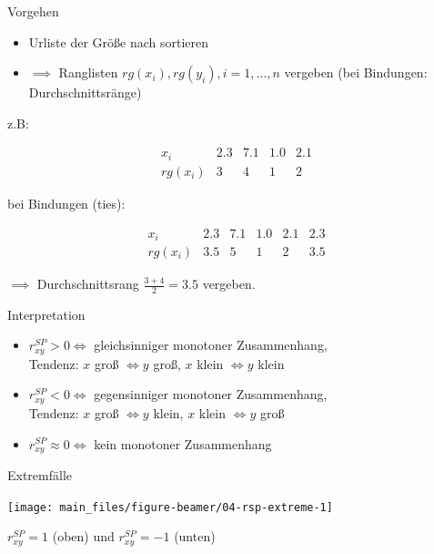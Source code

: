 \documentclass[
  10pt,
  ignorenonframetext,
]{beamer}
\providecommand{\tightlist}{%
  \setlength{\itemsep}{0pt}\setlength{\parskip}{0pt}}
\begin{document}
\begin{frame}{Vorgehen}
\label{vorgehen}
\begin{itemize}
\tightlist
\item
  Urliste der Größe nach sortieren
\item
  \(\implies\) Ranglisten \(rg(x_i), rg(y_i), i = 1,\ldots,n\) vergeben
  (bei Bindungen: Durchschnittsränge)
\end{itemize}

z.B:

\[
\begin{array}{cccccc}
x_i & 2.3 & 7.1 & 1.0 & 2.1\\
rg(x_i) & 3 & 4 & 1 & 2
\end{array}
\]

bei Bindungen (ties):

\[
\begin{array}{cccccc}
x_i & 2.3 & 7.1 & 1.0 & 2.1 & 2.3\\
rg(x_i) & 3.5 & 5 & 1 & 2 & 3.5
\end{array}
\]

\(\implies\) Durchschnittsrang \(\frac{3+4}{2} = 3.5\) vergeben.
\end{frame}

\begin{frame}{Interpretation}
\label{interpretation-2}
\begin{itemize}
\item
  \(r^{SP}_{xy} > 0 \iff\) gleichsinniger monotoner Zusammenhang,\\
  Tendenz: \(x\) groß \(\Leftrightarrow y\) groß, \(x\) klein
  \(\Leftrightarrow y\) klein
\item
  \(r^{SP}_{xy} < 0 \iff\) gegensinniger monotoner Zusammenhang,\\
  Tendenz: \(x\) groß \(\Leftrightarrow y\) klein, \(x\) klein
  \(\Leftrightarrow y\) groß
\item
  \(r^{SP}_{xy} \approx 0 \iff\) kein monotoner Zusammenhang
\end{itemize}
\end{frame}

\begin{frame}{Extremfälle}
\label{extremfuxe4lle}
\scriptsize

\begin{center}\texttt{[image: main\_files/figure-beamer/04-rsp-extreme-1]} \end{center}

\normalsize

\(r^{SP}_{xy}=1\) (oben) und \(r^{SP}_{xy} = -1\) (unten)
\end{frame}
\end{document}
